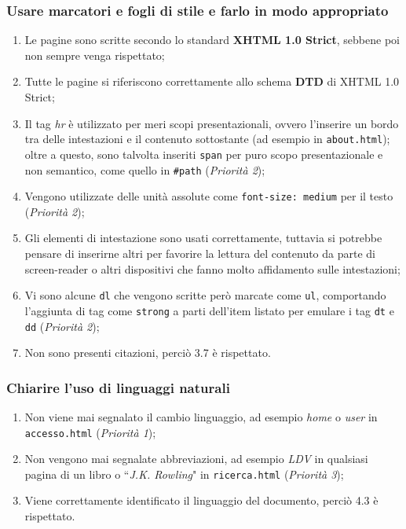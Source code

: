 \subsubsection{Usare marcatori e fogli di stile e farlo in modo appropriato}
\begin{enumerate}
\item Le pagine sono scritte secondo lo standard \textbf{XHTML 1.0 Strict},
sebbene poi non sempre venga rispettato;
\item Tutte le pagine si riferiscono correttamente allo schema \textbf{DTD} di
XHTML 1.0 Strict;
\item Il tag \textit{hr} è utilizzato per meri scopi presentazionali, ovvero
l'inserire un bordo tra delle intestazioni e il contenuto sottostante (ad
esempio in \texttt{about.html}); oltre a questo, sono talvolta inseriti
\texttt{span} per puro scopo presentazionale e non semantico, come quello in
\texttt{\#path} (\textit{Priorità 2});
\item Vengono utilizzate delle unità assolute come \texttt{font-size: medium}
per il testo (\textit{Priorità 2});
\item Gli elementi di intestazione sono usati correttamente, tuttavia si
potrebbe pensare di inserirne altri per favorire la lettura del contenuto da
parte di screen-reader o altri dispositivi che fanno molto affidamento sulle
intestazioni;
\item Vi sono alcune \texttt{dl} che vengono scritte però marcate come
\texttt{ul}, comportando l'aggiunta di tag come \texttt{strong} a parti
dell'item listato per emulare i tag \texttt{dt} e \texttt{dd}
(\textit{Priorità 2});
\item Non sono presenti citazioni, perciò 3.7 è rispettato.
\end{enumerate}

\subsubsection{Chiarire l'uso di linguaggi naturali}
\begin{enumerate}
\item Non viene mai segnalato il cambio linguaggio, ad esempio \textit{home} o
\textit{user} in \texttt{accesso.html} (\textit{Priorità 1});
\item Non vengono mai segnalate abbreviazioni, ad esempio \textit{LDV} in
qualsiasi pagina di un libro o ``\textit{J.K. Rowling}" in
\texttt{ricerca.html} (\textit{Priorità 3});
\item Viene correttamente identificato il linguaggio del documento, perciò 4.3
è rispettato.
\end{enumerate}

